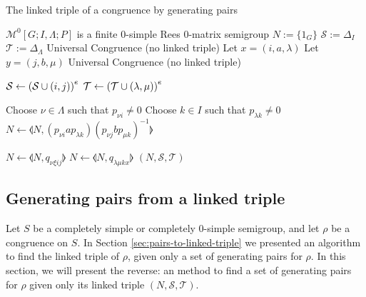 \begin{algorithm}
\caption{The linked triple of a congruence by generating pairs}
\label{alg:pairs-to-linked-triple}
\begin{algorithmic}[1]
    \Require $\mathcal{M}^0[G;I,\Lambda;P]$ is a finite 0-simple Rees 0-matrix semigroup
      \State $N := \{1_G\}$
      \State $\mathcal{S} := \Delta_I$
      \State $\mathcal{T} := \Delta_\Lambda$
          \State \Continue
          \State \Return Universal Congruence (no linked triple)
        \EndIf
        \State Let $x=(i,a,\lambda)$
        \State Let $y=(j,b,\mu)$
          \State \Return Universal Congruence (no linked triple)
        \EndIf

        \State $\mathcal{S} \gets \left(\mathcal{S} \cup (i,j)\right)^e$
        \State $\mathcal{T} \gets \left(\mathcal{T} \cup (\lambda, \mu)\right)^e$

        \State Choose $\nu \in \Lambda$ such that $p_{\nu i} \neq 0$
        \State Choose $k \in I$ such that $p_{\lambda k} \neq 0$
        \State $N \gets \llangle N, (p_{\nu i}ap_{\lambda k})(p_{\nu j}bp_{\mu k})^{-1} \rrangle$

          \State $N \gets \llangle N, q_{\nu \xi i j} \rrangle$
        \EndFor
          \State $N \gets \llangle N, q_{\lambda \mu k x} \rrangle$
        \EndFor
      \EndFor
      \State \Return $(N,\mathcal{S},\mathcal{T})$
    \EndProcedure
\end{algorithmic}
\end{algorithm}

\subsection{Generating pairs from a linked triple}
\label{sec:linked-triple-to-pairs}

Let $S$ be a completely simple or completely 0-simple semigroup, and let $\rho$
be a congruence on $S$.  In Section \ref{sec:pairs-to-linked-triple} we
presented an algorithm to find the linked triple of $\rho$, given only a set of
generating pairs for $\rho$.  In this section, we will present the reverse: an
method to find a set of generating pairs for $\rho$ given only its linked triple
$(N, \mathcal{S}, \mathcal{T})$.

